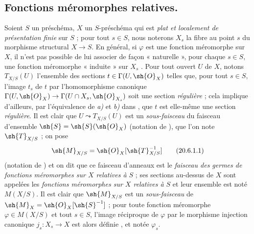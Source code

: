 \subsection{Fonctions méromorphes relatives.}

\begin{env}[20.6.1]
Soient $S$ un préschéma, $X$ un $S$-préschéma qui est \emph{plat et localement de présentation finie} sur $S$ ; pour tout $s\in S$, nous noterons $X_s$ la fibre au point $s$ du morphisme structural $X\to S$.
En général, si $\varphi$ est une fonction méromorphe sur $X$, il n'est pas possible de lui associer de façon « naturelle », pour chaque $s\in S$, une fonction méromorphe « induite » sur $X_s$ .
Pour tout ouvert $U$ de $X$, notons $T_{X/S}(U)$ l'ensemble des sections $t\in\Gamma(U,\sh{O}_X)$ telles que, pour tout $s\in S$, l'image $t_s$ de $t$ par l'homomorphisme canonique $\Gamma(U,\sh{O}_X)\to\Gamma(U\cap X_s,\sh{O}_{X_s})$ soit une section \emph{régulière} ; cela implique d'ailleurs, par l'équivalence de \emph{a)} et \emph{b)} dans , que $t$ est elle-même une section \emph{régulière}.
Il est clair que $U\leadsto T_{X/S}(U)$ est un \emph{sous-faisceau} du faisceau d'ensemble $\sh{S}=\sh{S}(\sh{O}_X)$ (notation de ), que l'on note $\sh{T}_{X/S}$ ; on pose
\[
\label{IV.20.6.1.1}
  \sh{M}_{X/S}=\sh{O}_X[\sh{T}_{X/S}^{-1}]
  \tag{20.6.1.1}
\]
(notation de ) et on dit que ce faisceau d'anneaux est le \emph{faisceau des germes de fonctions méromorphes sur $X$ relatives à $S$} ; ses sections au-dessus de $X$ sont appelées les \emph{fonctions méromorphes sur $X$ relatives à $S$} et leur ensemble est noté $M(X/S)$.
Il est clair que $\sh{M}_{X/S}$ est un \emph{sous-faisceau} de $\sh{M}_X=\sh{O}_X[\sh{S}^{-1}]$ ; pour toute fonction méromorphe $\varphi\in M(X/S)$ et tout $s\in S$, l'image réciproque de $\varphi$ par le morphisme injection canonique $j_s:X_s\to X$ est alors définie , et notée $\varphi_s$.
\end{env}

